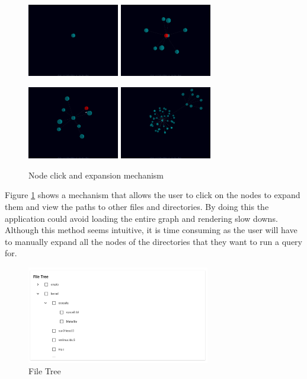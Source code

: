 \begin{figure} [!htbp]
    \includegraphics[width=4cm]{figs/node_click_0.png} \hfill
    \includegraphics[width=4cm]{figs/node_click_1.png} \\
    \vspace{5mm}

    \includegraphics[width=4cm]{figs/node_click_2.png}\hfill
    \includegraphics[width=4cm]{figs/node_click_3.png}
    \caption{ Node click and expansion mechanism}
    \label{fig:nodeclickmech}
\end{figure}

Figure \ref{fig:nodeclickmech} shows a mechanism that allows the user to click on the nodes to expand them and view the paths
to other files and directories. By doing this the application could avoid loading the entire graph and rendering slow downs. Although this method seems intuitive, it is time consuming as the user will have to manually expand all the nodes of the directories that they want to run a query for.

\begin{figure}[!htbp]
    \includegraphics[width=8cm]{figs/file_tree.png}
    \centering
    \caption{File Tree}
    \label{fig:filetree}
\end{figure}


